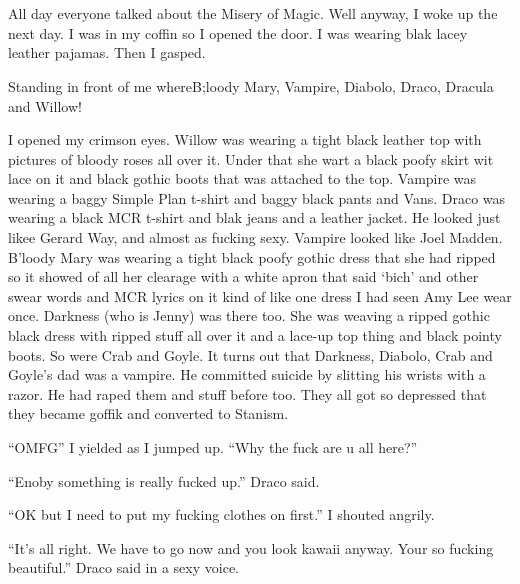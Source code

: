 \section{\chaptername~\thesection}



All day everyone talked about the Misery of Magic. Well anyway, I woke up the next day. I was in my coffin so I opened the door. I was wearing blak lacey leather pajamas. Then I gasped.

Standing in front of me where\dotfill\newline B;loody Mary, Vampire, Diabolo, Draco, Dracula and Willow!

I opened my crimson eyes. Willow was wearing a tight black leather top with pictures of bloody roses all over it. Under that she wart a black poofy skirt wit lace on it and black gothic boots that was attached to the top. Vampire was wearing a baggy Simple Plan t-shirt and baggy black pants and Vans. Draco was wearing a black MCR t-shirt and blak jeans and a leather jacket. He looked just likee Gerard Way, and almost as fucking sexy. Vampire looked like Joel Madden. B'loody Mary was wearing a tight black poofy gothic dress that she had ripped so it showed of all her clearage with a white apron that said \enquote*{bich} and other swear words and MCR lyrics on it kind of like one dress I had seen Amy Lee wear once. Darkness (who is Jenny) was there too. She was weaving a ripped gothic black dress with ripped stuff all over it and a lace-up top thing and black pointy boots. So were Crab and Goyle. It turns out that Darkness, Diabolo, Crab and Goyle's dad was a vampire. He committed suicide by slitting his wrists with a razor. He had raped them and stuff before too. They all got so depressed that they became goffik and converted to Stanism.

\enquote{OMFG} I yielded as I jumped up. \enquote{Why the fuck are u all here?}

\enquote{Enoby something is really fucked up.} Draco said.

\enquote{OK but I need to put my fucking clothes on first.} I shouted angrily.

\enquote{It's all right. We have to go now and you look kawaii anyway. Your so fucking beautiful.} Draco said in a sexy voice.

